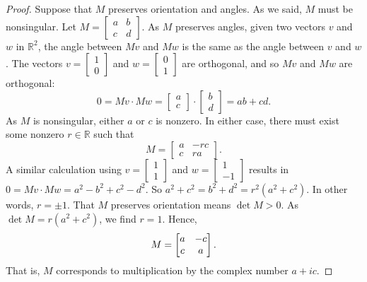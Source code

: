 \documentclass[12pt,openany]{book}
\newcommand{\avoidbreak}{\postdisplaypenalty=100}
\newcommand{\R}{{\mathbb{R}}}
\theoremstyle{plain}
\theoremstyle{remark}
\theoremstyle{definition}
\theoremstyle{exercise}
\theoremstyle{example}
\begin{document}
\begin{proof}
Suppose that $M$ preserves orientation and angles.
As we said, $M$ must be nonsingular.
Let $M =
\left[\begin{smallmatrix}a&b\\c&d\end{smallmatrix}\right]$.
As $M$ preserves angles, given two vectors $v$ and
$w$ in $\R^2$, the angle between $Mv$ and $Mw$ is the same as the angle
between $v$ and $w$.
The vectors
$v=\left[\begin{smallmatrix}1\\0\end{smallmatrix}\right]$ and
$w=\left[\begin{smallmatrix}0\\1\end{smallmatrix}\right]$ are
orthogonal, and so $Mv$ and $Mw$ are orthogonal:
\begin{equation*}
0 = Mv \cdot Mw = 
\begin{bmatrix} a\\c \end{bmatrix}
\cdot
\begin{bmatrix} b\\d \end{bmatrix}
=
ab+cd .
\end{equation*}
As $M$ is nonsingular, either $a$ or $c$ is nonzero.  In either case,
there must exist some nonzero $r \in \R$ such that
\begin{equation*}
M =
\begin{bmatrix}
a &-rc \\
c & ra
\end{bmatrix} .
\end{equation*}
A similar calculation using
$v=\left[\begin{smallmatrix}1\\1\end{smallmatrix}\right]$ and
$w=\left[\begin{smallmatrix}1\\-1\end{smallmatrix}\right]$ results in
$0 = Mv \cdot Mw = a^2-b^2+c^2-d^2$.
So
$a^2+c^2 = b^2+d^2 = r^2(a^2+c^2)$.  In other words, $r=\pm 1$.
That $M$ preserves orientation means $\det M > 0$.
As $\det M = r(a^2+c^2)$, we find $r=1$.
Hence,
\begin{equation*}
M =
\begin{bmatrix}
a & -c \\
c &  a
\end{bmatrix} .
\avoidbreak
\end{equation*}
That is, $M$ corresponds to multiplication by the complex number
$a+ic$.


\end{proof}
\end{document}
